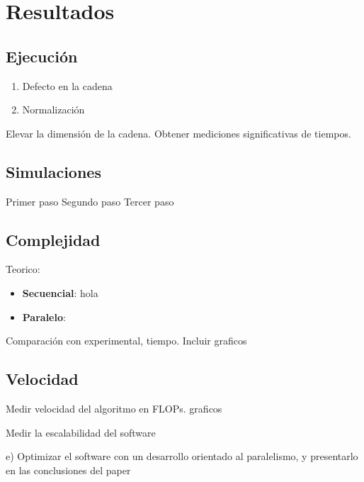 \section{Resultados}

\subsection{Ejecución}

\begin{enumerate}
	\item Defecto en la cadena
	      	          
	\item Normalización
	      	          
\end{enumerate}

Elevar la dimensión de la cadena. Obtener mediciones significativas de tiempos.

\subsection{Simulaciones}
Primer paso
Segundo paso
Tercer paso

\subsection{Complejidad}

Teorico:

\begin{itemize}
	\item \textbf{Secuencial}:
	      hola
	\item \textbf{Paralelo}:
	      	          
\end{itemize}

Comparación con experimental, tiempo. Incluir graficos

\subsection{Velocidad}

Medir velocidad del algoritmo en FLOPs. graficos

Medir la escalabilidad del software

e) Optimizar el software con un desarrollo orientado al paralelismo, y presentarlo
en las conclusiones del paper